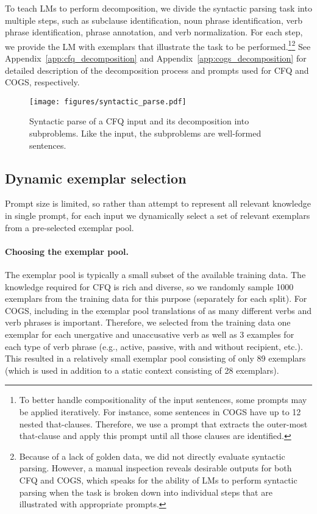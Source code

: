 \documentclass{article} \usepackage{iclr2022_conference,times}
\begin{document}
To teach LMs to perform decomposition, we divide the syntactic parsing task into multiple steps, such as  subclause identification, noun phrase identification, verb phrase identification, phrase annotation, and verb normalization. For each step, we provide the LM with exemplars that illustrate the task to be performed.\footnote{To better handle compositionality of the input sentences, some prompts may be applied iteratively. For instance, some sentences in COGS have up to 12 nested that-clauses. Therefore, we use a prompt that extracts the outer-most that-clause and apply this prompt until all those clauses are identified.}\footnote{Because of a lack of golden data, we did not directly evaluate  syntactic parsing. However, a manual inspection reveals desirable outputs for both CFQ and COGS, which speaks for the ability of LMs to perform syntactic parsing when the task is broken down into individual steps that are illustrated with appropriate prompts.} See Appendix~\ref{app:cfq_decomposition} and Appendix~\ref{app:cogs_decomposition} for detailed description of the decomposition process and prompts used for CFQ and COGS, respectively.

\begin{figure}[t!]
\texttt{[image: figures/syntactic\_parse.pdf]}
    \caption{Syntactic parse of a CFQ input and its decomposition into subproblems. Like the input, the subproblems are well-formed sentences.}
    \label{fig:dynamic_l2m_solution}
\end{figure}

\subsection{Dynamic exemplar selection}
\label{sec:dynamic_exemplar_selection}

Prompt size is limited, so rather than attempt to represent all relevant knowledge in single prompt, for each input we dynamically select  a set of relevant exemplars from a pre-selected exemplar pool.

\paragraph{Choosing the exemplar pool.}
The exemplar pool is typically a small subset of the available training data. The knowledge required for CFQ is rich and diverse, so we randomly sample 1000 exemplars from the training data for this purpose (separately for each split).
For COGS, including in the exemplar pool translations of as many different verbs and verb phrases is important. Therefore, we selected from the training data one exemplar for each unergative and unaccusative verb as well as 3 examples for each type of verb phrase (e.g., active, passive, with and without recipient, etc.). This resulted in a relatively small exemplar pool consisting of only 89 exemplars (which is used in addition to a static context consisting of 28 exemplars).
\end{document}
